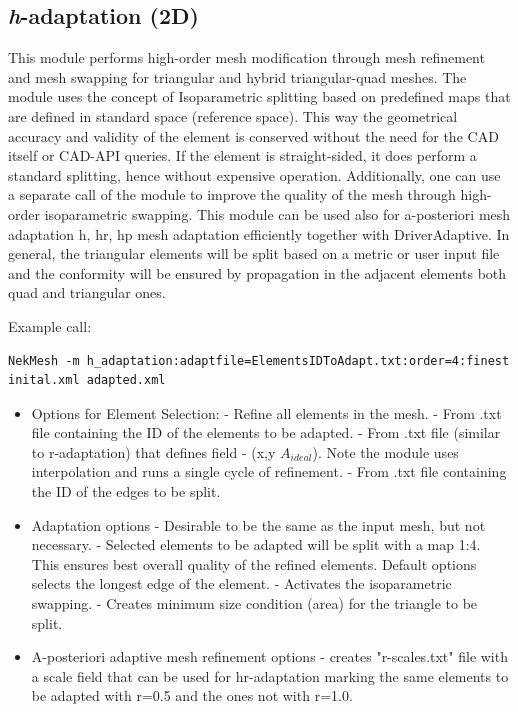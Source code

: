 \subsection{\emph{h}-adaptation (2D)}
This module performs high-order mesh modification through mesh refinement
and mesh swapping for triangular and hybrid triangular-quad meshes. 
The module uses the concept of Isoparametric splitting based on
predefined maps that are defined in standard space (reference space).
This way the geometrical accuracy and validity of the element is conserved
without the need for the CAD itself or CAD-API queries. If the element is
straight-sided, it does perform a standard splitting, hence without expensive
operation. Additionally, one can use a separate call of the module to improve
the quality of the mesh through high-order isoparametric swapping. This module
can be used also for a-posteriori mesh adaptation h, hr, hp mesh adaptation
efficiently together with DriverAdaptive. In general, the triangular elements
will be split based on a metric or user input file and the conformity will be
ensured by propagation in the adjacent elements both quad and triangular ones. 

Example call: 
\begin{lstlisting}[style=BashInputStyle]
NekMesh -m h_adaptation:adaptfile=ElementsIDToAdapt.txt:order=4:finest inital.xml adapted.xml
\end{lstlisting}

\begin{itemize}
	\item Options for Element Selection:
		\subitem {} - Refine all elements in the mesh.
		\subitem {} - From .txt file containing the ID of the elements to be adapted.
		\subitem {} - From .txt file (similar to r-adaptation) that defines field - (x,y $A_{ideal}$). Note the module uses interpolation and runs a single cycle of refinement. 
		\subitem {} - From .txt file containing the ID of the edges to be split.
	\item Adaptation options
		\subitem {} - Desirable to be the same as the input mesh, but not necessary.	
		\subitem {} - Selected elements to be adapted will be split with a map 1:4. This ensures best overall quality of the refined elements. Default options selects the longest edge of the element.
		\subitem {} - Activates the isoparametric swapping.
		\subitem {} - Creates minimum size condition (area) for the triangle to be split.
	\item A-posteriori adaptive mesh refinement options
		\subitem {} - creates "r-scales.txt" file with a scale field that can be used for hr-adaptation marking the same elements to be adapted with r=0.5 and the ones not with r=1.0.
\end{itemize}

